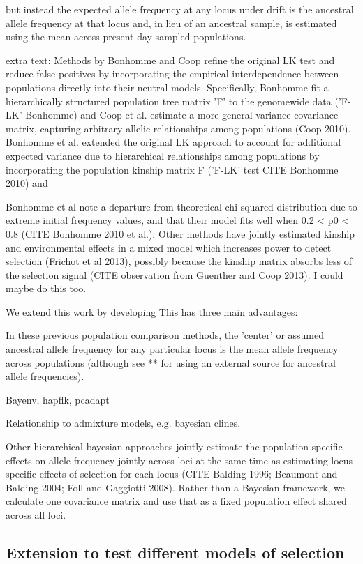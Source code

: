 \documentclass[12pt]{report}
\begin{document}
but instead the expected allele frequency at any locus under drift is the ancestral allele frequency at that locus and, in lieu of an ancestral sample, is estimated using the mean across present-day sampled populations. 


extra text:
Methods by Bonhomme and Coop refine the original LK test and reduce false-positives by incorporating the empirical interdependence between populations directly into their neutral models. Specifically, Bonhomme fit a hierarchically structured population tree matrix 'F' to the genomewide data ('F-LK' Bonhomme) and Coop et al. estimate a more general variance-covariance matrix, capturing arbitrary allelic relationships among populations (Coop 2010). Bonhomme et al. extended the original LK approach to account for additional expected variance due to hierarchical relationships among populations by incorporating the population kinship matrix F ('F-LK' test CITE Bonhomme 2010) and  


Bonhomme et al note a departure from theoretical chi-squared distribution due to extreme initial frequency values, and that their model fits well when 0.2 < p0 < 0.8 (CITE Bonhomme 2010 et al.).
Other methods have jointly estimated kinship and environmental effects in a mixed model which increases power to detect selection (Frichot et al 2013), possibly because the kinship matrix absorbs less of the selection signal (CITE observation from Guenther and Coop 2013). I could maybe do this too.

We extend this work by developing 
This has three main advantages:

In these previous population comparison methods, the 'center' or assumed ancestral allele frequency for any particular locus is the mean allele frequency across populations (although see ** for using an external source for ancestral allele frequencies). 

Bayenv, hapflk, pcadapt

Relationship to admixture models, e.g. bayesian clines.

Other hierarchical bayesian approaches jointly estimate the population-specific effects on allele frequency jointly across loci at the same time as estimating locus-specific effects of selection for each locus (CITE Balding 1996; Beaumont and Balding 2004; Foll and Gaggiotti 2008). Rather than a Bayesian framework, we calculate one covariance matrix and use that as a fixed population effect shared across all loci.

\subsection{Extension to test different models of selection}
\end{document}

